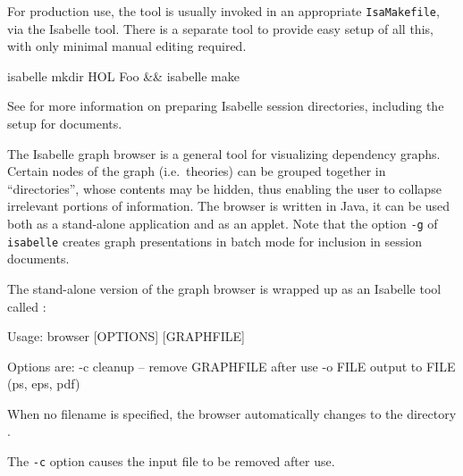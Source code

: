 \begin{isabellebody}
\begin{isamarkuptext}
  \medskip For production use, the \hyperlink{tool.usedir}{\mbox{}} tool is usually
  invoked in an appropriate \verb|IsaMakefile|, via the Isabelle
  \hyperlink{tool.make}{\mbox{}} tool.  There is a separate \hyperlink{tool.mkdir}{\mbox{}} tool to
  provide easy setup of all this, with only minimal manual editing
  required.
\begin{ttbox}
isabelle mkdir HOL Foo && isabelle make
\end{ttbox}
  See  for more information on preparing
  Isabelle session directories, including the setup for documents.%
\end{isamarkuptext}%
\isamarkuptrue%
%
\isamarkuptrue%
%
\begin{isamarkuptext}%

  The Isabelle graph browser is a general tool for visualizing
  dependency graphs.  Certain nodes of the graph (i.e.~theories) can
  be grouped together in ``directories'', whose contents may be
  hidden, thus enabling the user to collapse irrelevant portions of
  information.  The browser is written in Java, it can be used both as
  a stand-alone application and as an applet.  Note that the option
  \verb|-g| of \verb|isabelle| \hyperlink{tool.usedir}{\mbox{}} creates
  graph presentations in batch mode for inclusion in session
  documents.%
\end{isamarkuptext}%
\isamarkuptrue%
%
\isamarkuptrue%
%
\begin{isamarkuptext}%
The stand-alone version of the graph browser is wrapped up as an
  Isabelle tool called \hypertarget{tool.browser}{\hyperlink{tool.browser}{\mbox{}}}:

\begin{ttbox}
Usage: browser [OPTIONS] [GRAPHFILE]

  Options are:
    -c           cleanup -- remove GRAPHFILE after use
    -o FILE      output to FILE (ps, eps, pdf)
\end{ttbox}
  When no filename is specified, the browser automatically changes to
  the directory \hyperlink{setting.ISABELLE-BROWSER-INFO}{\mbox{}}.

  \medskip The \verb|-c| option causes the input file to be
  removed after use.


\end{isamarkuptext}
\end{isabellebody}
